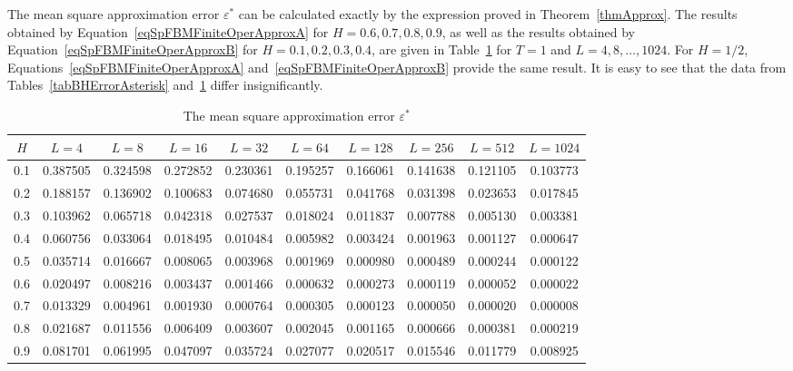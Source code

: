 \documentclass[10pt,reqno]{amsart}
\theoremstyle{plain}
\theoremstyle{remark}
\begin{document}
The mean square approximation error $\varepsilon^*$ can be calculated exactly by the expression proved in Theorem~\ref{thmApprox}. The results obtained by Equation~\eqref{eqSpFBMFiniteOperApproxA} for $H = 0.6,0.7,0.8,0.9$, as well as the results obtained by Equation~\eqref{eqSpFBMFiniteOperApproxB} for $H = 0.1,0.2,0.3,0.4$, are given in Table~\ref{tabBHErrorAsteriskNew} for $T = 1$ and $L = 4,8,\dots,1024$. For $H = 1/2$, Equations~\eqref{eqSpFBMFiniteOperApproxA} and~\eqref{eqSpFBMFiniteOperApproxB} provide the same result. It is easy to see that the data from Tables~\ref{tabBHErrorAsterisk} and~\ref{tabBHErrorAsteriskNew} differ insignificantly.

\begin{table}[ht]
\begin{center}
\renewcommand{\arraystretch}{1.1}
\caption{The mean square approximation error $\varepsilon^{*}$}\label{tabBHErrorAsteriskNew}
\begin{tabular}{cccccccccc}
  \hline
  $H$ & $L = 4$ & $L = 8$ & $L = 16$ & $L = 32$ & $L = 64$ & $L = 128$ & $L = 256$ & $L = 512$ & $L = 1024$ \\
  \hline
  0.1 & 0.387505 & 0.324598 & 0.272852 & 0.230361 & 0.195257 & 0.166061 & 0.141638 & 0.121105 & 0.103773 \\
  0.2 & 0.188157 & 0.136902 & 0.100683 & 0.074680 & 0.055731 & 0.041768 & 0.031398 & 0.023653 & 0.017845 \\
  0.3 & 0.103962 & 0.065718 & 0.042318 & 0.027537 & 0.018024 & 0.011837 & 0.007788 & 0.005130 & 0.003381 \\
  0.4 & 0.060756 & 0.033064 & 0.018495 & 0.010484 & 0.005982 & 0.003424 & 0.001963 & 0.001127 & 0.000647 \\
  0.5 & 0.035714 & 0.016667 & 0.008065 & 0.003968 & 0.001969 & 0.000980 & 0.000489 & 0.000244 & 0.000122 \\
  0.6 & 0.020497 & 0.008216 & 0.003437 & 0.001466 & 0.000632 & 0.000273 & 0.000119 & 0.000052 & 0.000022 \\
  0.7 & 0.013329 & 0.004961 & 0.001930 & 0.000764 & 0.000305 & 0.000123 & 0.000050 & 0.000020 & 0.000008 \\
  0.8 & 0.021687 & 0.011556 & 0.006409 & 0.003607 & 0.002045 & 0.001165 & 0.000666 & 0.000381 & 0.000219 \\
  0.9 & 0.081701 & 0.061995 & 0.047097 & 0.035724 & 0.027077 & 0.020517 & 0.015546 & 0.011779 & 0.008925 \\
  \hline
\end{tabular}
\end{center}
\end{table}
\end{document}

